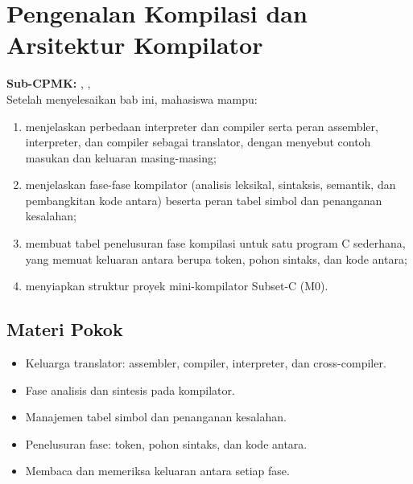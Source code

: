 \documentclass[../../main.tex]{subfiles}
\begin{document}
\chapter[Pengenalan Kompilasi dan Arsitektur Kompilator]{Pengenalan Kompilasi dan Arsitektur Kompilator}
\label{chap:arsitektur}

\begin{outcomebox}
\textbf{Sub-CPMK:} , , \\[3pt]
Setelah menyelesaikan bab ini, mahasiswa mampu:
\begin{enumerate}[label=\arabic*.,leftmargin=*]
  \item menjelaskan perbedaan interpreter dan compiler serta peran
        assembler, interpreter, dan compiler sebagai translator,
        dengan menyebut contoh masukan dan keluaran masing-masing;
  \item menjelaskan fase-fase kompilator (analisis leksikal,
        sintaksis, semantik, dan pembangkitan kode antara) beserta
        peran tabel simbol dan penanganan kesalahan;
  \item membuat tabel penelusuran fase kompilasi untuk satu program C
        sederhana, yang memuat keluaran antara berupa token, pohon
        sintaks, dan kode antara;
  \item menyiapkan struktur proyek mini-kompilator Subset-C (M0).
\end{enumerate}
\end{outcomebox}

\section*{Materi Pokok}
\begin{itemize}[leftmargin=*]
  \item Keluarga translator: assembler, compiler, interpreter, dan
        cross-compiler.
  \item Fase analisis dan sintesis pada kompilator.
  \item Manajemen tabel simbol dan penanganan kesalahan.
  \item Penelusuran fase: token, pohon sintaks, dan kode antara.
  \item Membaca dan memeriksa keluaran antara setiap fase.
\end{itemize}















\ifSubfilesClassLoaded{%
}{}
\end{document}

